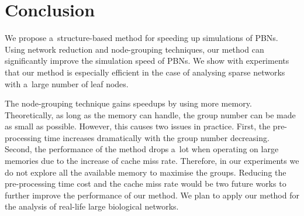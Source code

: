 \documentclass[runningheads,a4paper]{llncs}
\begin{document}
\section{Conclusion}
\label{sec:conclusion}
We propose a~structure-based method for speeding up simulations of PBNs. Using network reduction
and node-grouping techniques, our method can significantly improve the simulation speed of PBNs.
We show with experiments that our method is especially efficient in the case of analysing sparse
networks with a~large number of leaf nodes.

The node-grouping technique gains speedups by using more memory. Theoretically, as long as the
memory can handle, the group number can be made as small as possible. However, this causes two
issues in practice. First, the pre-processing time increases dramatically with the group number
decreasing. Second, the performance of the method drops a~lot when operating on large memories due
to the increase of cache miss rate. Therefore, in our experiments we do not explore all the
available memory to maximise the groups. Reducing the pre-processing time cost and the cache miss
rate would be two future works to further improve the performance of our method.
We plan to apply our method for the analysis of real-life large biological networks.



\end{document}
